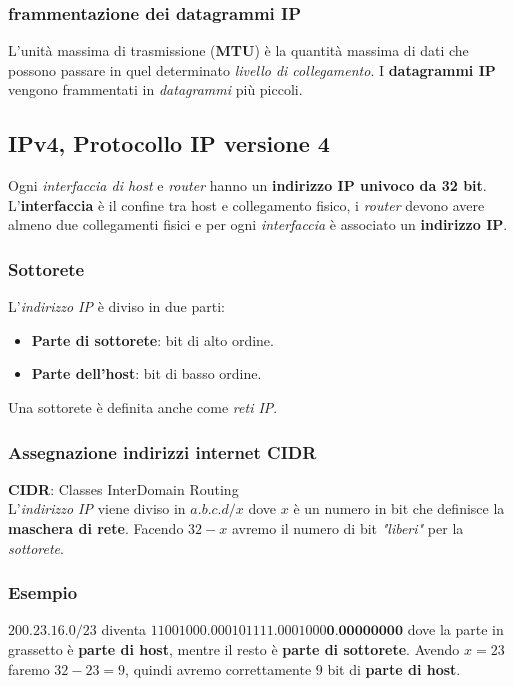 \subsubsection{frammentazione dei datagrammi IP}
L'unità massima di trasmissione (\textbf{MTU}) è la quantità massima di dati che possono passare in quel determinato \textit{livello di collegamento}. 
I \textbf{datagrammi IP} vengono frammentati in \textit{datagrammi} più piccoli. 

\subsection{IPv4, Protocollo IP versione 4}
Ogni \textit{interfaccia di host} e \textit{router} hanno un \textbf{indirizzo IP univoco da 32 bit}. 
L'\textbf{interfaccia} è il confine tra host e collegamento fisico, i \textit{router} devono avere almeno due collegamenti fisici  e per ogni \textit{interfaccia} è associato un \textbf{indirizzo IP}. 

\subsubsection{Sottorete}
L'\textit{indirizzo IP} è diviso in due parti:
\begin{itemize}
  \item \textbf{Parte di sottorete}: bit di alto ordine. 
  \item \textbf{Parte dell'host}: bit di basso ordine. 
\end{itemize}
Una sottorete è definita anche come \textit{reti IP}. 

\subsubsection{Assegnazione indirizzi internet CIDR}
\textbf{CIDR}: Classes InterDomain Routing \\ 
L'\textit{indirizzo IP} viene diviso in $a.b.c.d/x$ dove $x$ è un numero in bit che definisce la \textbf{maschera di rete}. 
Facendo $32 - x$ avremo il numero di bit \textit{"liberi"} per la \textit{sottorete}. 
\subsubsection*{Esempio}
$200.23.16.0/23$ diventa $11001000.000101111.0001000\textbf{0}.\textbf{00000000}$ dove la parte in grassetto è \textbf{parte di host}, mentre il resto è \textbf{parte di sottorete}. Avendo $x=23$ faremo $32-23 = 9$, quindi avremo correttamente $9$ bit di \textbf{parte di host}. 

